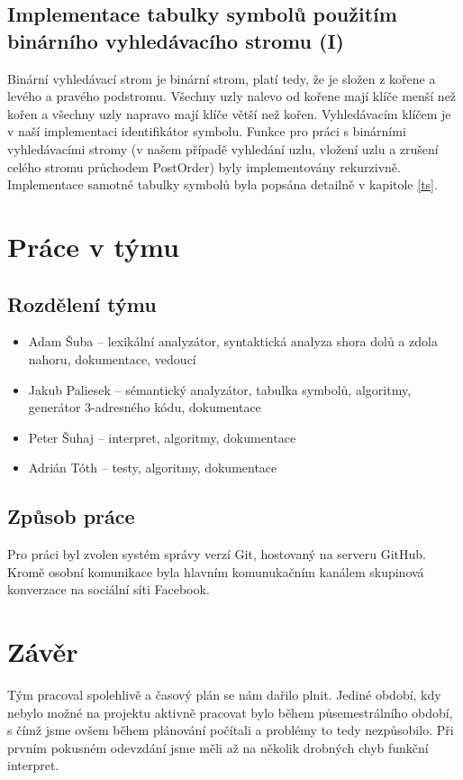 \documentclass[a4paper, 11pt]{article}
\begin{document}
    \subsection{Implementace tabulky symbolů použitím binárního vyhledávacího stromu (I)}
    Binární vyhledávací strom je binární strom, platí tedy, že je složen z kořene a levého a pravého podstromu. Všechny uzly nalevo od kořene mají klíče menší než kořen a všechny uzly napravo mají klíče větší než kořen. Vyhledávacím klíčem je v naší implementaci identifikátor symbolu. Funkce pro práci s binárními vyhledávacími stromy (v našem případě vyhledání uzlu, vložení uzlu a zrušení celého stromu průchodem PostOrder) byly implementovány rekurzivně. Implementace samotné tabulky symbolů byla popsána detailně v kapitole \ref{ts}.
    \section{Práce v týmu}
    \subsection{Rozdělení týmu}
    \begin{itemize}
        \item Adam Šuba – lexikální analyzátor, syntaktická analyza shora dolů a zdola nahoru, dokumentace, vedoucí
        \item Jakub Paliesek – sémantický analyzátor, tabulka symbolů, algoritmy, generátor 3-adresného kódu, dokumentace
        \item Peter Šuhaj – interpret, algoritmy, dokumentace
        \item Adrián Tóth – testy, algoritmy, dokumentace
    \end{itemize}
    \subsection{Způsob práce}
    Pro práci byl zvolen systém správy verzí Git, hostovaný na serveru GitHub. Kromě osobní komunikace byla hlavním komunukačním kanálem skupinová konverzace na sociální síti Facebook.
    \section{Závěr}
    Tým pracoval spolehlivě a časový plán se nám dařilo plnit. Jediné období, kdy nebylo možné na projektu aktivně pracovat bylo během půsemestrálního období, s čímž jsme ovšem během plánování počítali a problémy to tedy nezpůsobilo. Při prvním pokusném odevzdání jsme měli až na několik drobných chyb funkční interpret.
\end{document}
